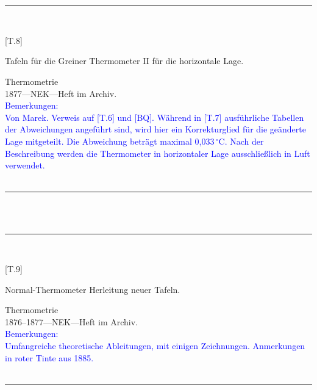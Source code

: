 \\
\vspace*{-2.5pt}\\
\parbox{\textwidth}{%
\rule{\textwidth}{1pt}\vspace*{-3mm}\\
\begin{minipage}[t]{0.2\textwidth}\vspace{0pt}
\Huge\rule[-4mm]{0cm}{1cm}[T.8]
\end{minipage}
\hfill
\begin{minipage}[t]{0.8\textwidth}\vspace{0pt}
\large Tafeln für die Greiner Thermometer II für die horizontale Lage.\rule[-2mm]{0mm}{2mm}
\end{minipage}
{\footnotesize\flushright
Thermometrie\\
}
1877\quad---\quad NEK\quad---\quad Heft im Archiv.\\
\textcolor{blue}{Bemerkungen:\\{}
Von Marek. Verweis auf [T.6] und [BQ]. Während in [T.7] ausführliche Tabellen der Abweichungen angeführt sind, wird hier ein Korrekturglied für die geänderte Lage mitgeteilt. Die Abweichung beträgt maximal 0,033\,{$^\circ$}C. Nach der Beschreibung werden die Thermometer in horizontaler Lage ausschließlich in Luft verwendet.\\{}
}
\\[-15pt]
\rule{\textwidth}{1pt}
}
\\
\vspace*{-2.5pt}\\
\parbox{\textwidth}{%
\rule{\textwidth}{1pt}\vspace*{-3mm}\\
\begin{minipage}[t]{0.2\textwidth}\vspace{0pt}
\Huge\rule[-4mm]{0cm}{1cm}[T.9]
\end{minipage}
\hfill
\begin{minipage}[t]{0.8\textwidth}\vspace{0pt}
\large Normal-Thermometer Herleitung neuer Tafeln.\rule[-2mm]{0mm}{2mm}
\end{minipage}
{\footnotesize\flushright
Thermometrie\\
}
1876--1877\quad---\quad NEK\quad---\quad Heft im Archiv.\\
\textcolor{blue}{Bemerkungen:\\{}
Umfangreiche theoretische Ableitungen, mit einigen Zeichnungen. Anmerkungen in roter Tinte aus 1885.\\{}
}
\\[-15pt]
\rule{\textwidth}{1pt}
}
